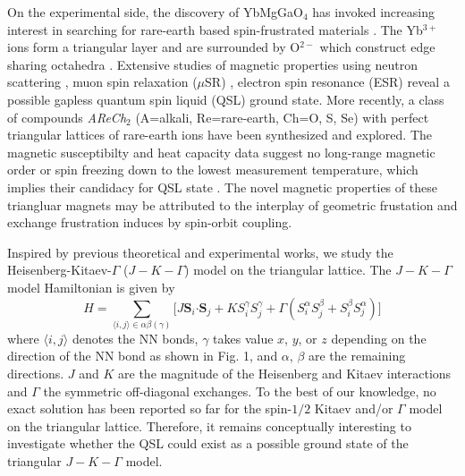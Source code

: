 \documentclass[aps,prb,reprint,groupedaddress,showpacs,amsfonts,amsmath,amssymb,superscriptaddress]{revtex4-1}
\begin{document}
On the experimental side, the discovery of YbMgGaO$_4$ has invoked increasing interest in searching for rare-earth based spin-frustrated materials \cite{srep16419,PhysRevLett.115.167203,PhysRevB.94.035107,PhysRevB.96.054445,PhysRevB.97.184413,PhysRevB.97.125105,PhysRevB.96.075105,PhysRevLett.119.157201}. The Yb$^{3+}$ ions form a triangular layer and are surrounded by O$^{2-}$ which construct edge sharing octahedra \cite{srep16419,PhysRevLett.115.167203}. Extensive studies of magnetic properties using neutron scattering \cite{Nature20614,nphys3971,PhysRevLett.117.267202,PhysRevX.8.031001}, muon spin relaxation ($\mu$SR) \cite{PhysRevLett.117.097201}, electron spin resonance (ESR) \cite{PhysRevLett.115.167203} reveal a possible gapless quantum spin liquid (QSL) ground state. More recently, a class of compounds \emph{AReCh}$_2$ (A=alkali, Re=rare-earth, Ch=O, S, Se) with perfect triangular lattices of rare-earth ions have been synthesized and explored. The magnetic susceptibilty and heat capacity data suggest no long-range magnetic order or spin freezing down to the lowest measurement temperature, which implies their candidacy for QSL state \cite{acsmaterialslett.9b00464,PhysRevMaterials.3.114413,arXiv1911.08036,Liu_2018,arXiv1911.12712}. The novel magnetic properties of these triangluar magnets may be attributed to the interplay of geometric frustation and exchange frustration induces by spin-orbit coupling.

Inspired by previous theoretical and experimental works, we study the Heisenberg-Kitaev-$\Gamma$ ($J-K-\Gamma$) model on the triangular lattice. The $J-K-\Gamma$ model Hamiltonian is given by
\begin{equation}
    H=\sum_{\langle i,j \rangle \in \alpha \beta (\gamma)} \lbrack J \bm{S}_i \bm{\cdot} \bm{S}_j + K S_i^{\gamma} S_j^{\gamma} + \Gamma (S_i^{\alpha} S_j^{\beta} + S_i^{\beta} S_j^{\alpha}) \rbrack
\end{equation}
where $\langle i,j \rangle$ denotes the NN bonds, $\gamma$ takes value $x$, $y$, or $z$ depending on the direction of the NN bond as shown in Fig. 1, and $\alpha$, $\beta$ are the remaining directions. $J$ and $K$ are the magnitude of the Heisenberg and Kitaev interactions and $\Gamma$ the symmetric off-diagonal exchanges. To the best of our knowledge, no exact solution has been reported so far for the spin-$1/2$ Kitaev and/or $\Gamma$ model on the triangular lattice. Therefore, it remains conceptually interesting to investigate whether the QSL could exist as a possible ground state of the triangular $J-K-\Gamma$ model.
\end{document}
